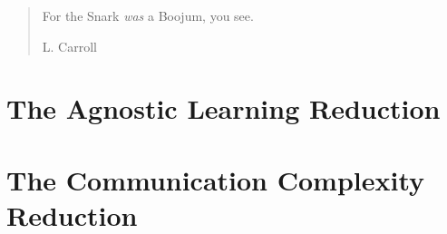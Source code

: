 \blockquote[L. Carroll]{For the Snark \emph{was} a Boojum, you see.}

\section{The Agnostic Learning Reduction}
\section{The Communication Complexity Reduction}
